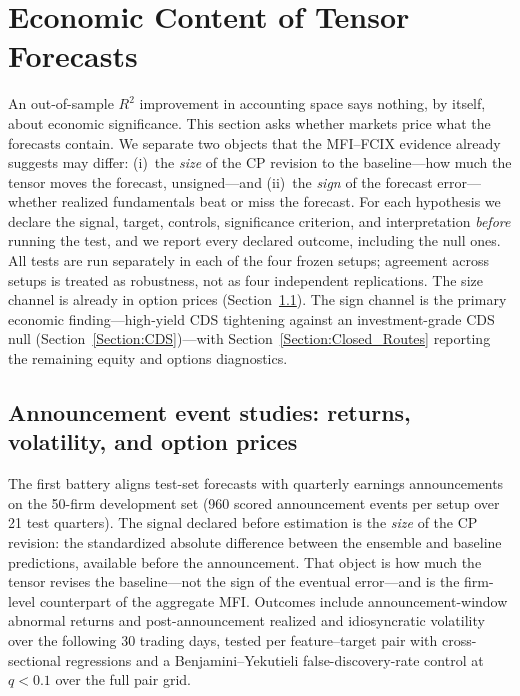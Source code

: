 \documentclass[pdflatex,sn-mathphys-num]{sn-jnl}%
\theoremstyle{thmstyleone}%
\theoremstyle{thmstyletwo}%
\theoremstyle{thmstylethree}%
\begin{document}
\FloatBarrier
\section{Economic Content of Tensor Forecasts}
\label{Section:Economic_Content}

An out-of-sample $R^2$ improvement in accounting space says nothing, by itself, about economic significance. This section asks whether markets price what the forecasts contain. We separate two objects that the MFI--FCIX evidence already suggests may differ: (i)~the \emph{size} of the CP revision to the baseline---how much the tensor moves the forecast, unsigned---and (ii)~the \emph{sign} of the forecast error---whether realized fundamentals beat or miss the forecast. For each hypothesis we declare the signal, target, controls, significance criterion, and interpretation \emph{before} running the test, and we report every declared outcome, including the null ones. All tests are run separately in each of the four frozen setups; agreement across setups is treated as robustness, not as four independent replications. The size channel is already in option prices (Section~\ref{Section:Event_Study}). The sign channel is the primary economic finding---high-yield CDS tightening against an investment-grade CDS null (Section~\ref{Section:CDS})---with Section~\ref{Section:Closed_Routes} reporting the remaining equity and options diagnostics.

\subsection{Announcement event studies: returns, volatility, and option prices}
\label{Section:Event_Study}

The first battery aligns test-set forecasts with quarterly earnings announcements on the 50-firm development set (960 scored announcement events per setup over 21 test quarters). The signal declared before estimation is the \emph{size} of the CP revision: the standardized absolute difference between the ensemble and baseline predictions, available before the announcement. That object is how much the tensor revises the baseline---not the sign of the eventual error---and is the firm-level counterpart of the aggregate MFI. Outcomes include announcement-window abnormal returns and post-announcement realized and idiosyncratic volatility over the following 30 trading days, tested per feature--target pair with cross-sectional regressions and a Benjamini--Yekutieli false-discovery-rate control \citep{benjamini2001control} at $q<0.1$ over the full pair grid.
\end{document}
